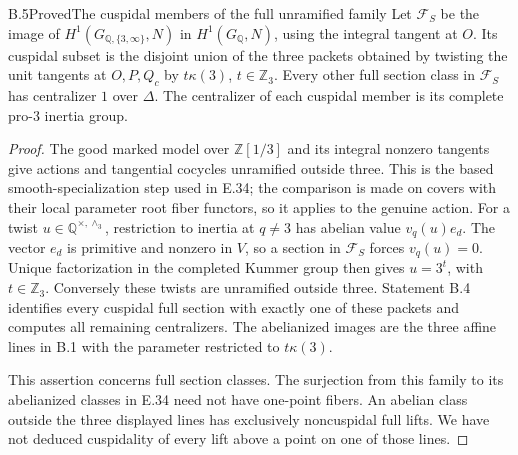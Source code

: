 \begin{statement}{B.5}{Proved}{The cuspidal members of the full unramified family}
Let $\mathscr F_S$ be the image of
$H^1(G_{\mathbb Q,\{3,\infty\}},N)$ in
$H^1(G_{\mathbb Q},N)$, using the integral tangent at $O$.
Its cuspidal subset is the disjoint union of the three
packets obtained by twisting the unit tangents at
$O,P,Q_c$ by $t\kappa(3)$, $t\in\mathbb Z_3$.
Every other full section class in $\mathscr F_S$ has
centralizer $1$ over $\Delta$.  The centralizer of each
cuspidal member is its complete pro-$3$ inertia group.
\end{statement}
\begin{proof}
The good marked model over $\mathbb Z[1/3]$ and its
integral nonzero tangents give actions and tangential
cocycles unramified outside three.  This is the based
smooth-specialization step used in E.34; the comparison
is made on covers with their local parameter root
fiber functors, so it applies to the genuine action.
For a twist $u\in\mathbb Q^{\times,\wedge_3}$,
restriction to inertia at $q\ne3$ has abelian value
$v_q(u)e_d$.  The vector $e_d$ is primitive and nonzero
in $V$, so a section in $\mathscr F_S$ forces
$v_q(u)=0$.  Unique factorization in the completed
Kummer group then gives $u=3^t$, with $t\in\mathbb Z_3$.
Conversely these twists are unramified outside three.
Statement B.4 identifies every cuspidal full section
with exactly one of these packets and computes all
remaining centralizers.  The abelianized images are
the three affine lines in B.1 with the parameter
restricted to $t\kappa(3)$.

This assertion concerns full section classes.
The surjection from this family to its abelianized
classes in E.34 need not have one-point fibers.
An abelian class outside the three displayed lines
has exclusively noncuspidal full lifts.  We have not
deduced cuspidality of every lift above a point on one
of those lines.
\end{proof}

